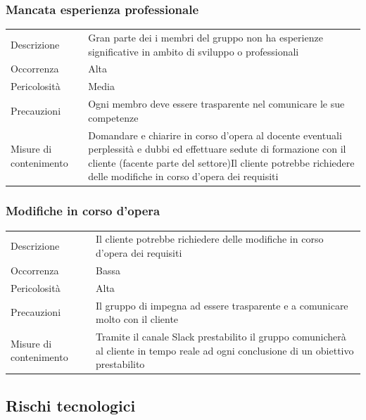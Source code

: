 \documentclass{article}
\begin{document}
\subsubsection{Mancata esperienza professionale}
\begin{center}
\begin{tabular}{P{10em} P{20em}} 
     Descrizione & Gran parte dei i membri del gruppo non ha esperienze significative in ambito di sviluppo o professionali\\ 
    Occorrenza & Alta\\
    Pericolosità & Media \\
    Precauzioni & Ogni membro deve essere trasparente nel comunicare le sue competenze \\
    Misure di contenimento & Domandare e chiarire in corso d'opera al docente eventuali perplessità e dubbi ed effettuare sedute di formazione con il cliente (facente parte del settore)Il cliente potrebbe richiedere delle modifiche in corso d'opera dei requisiti 
 \\
\end{tabular}
\end{center}

\subsubsection{Modifiche in corso d'opera}
\begin{center}
\begin{tabular}{P{10em} P{20em}} 
     Descrizione & Il cliente potrebbe richiedere delle modifiche in corso d'opera dei requisiti\\ 
    Occorrenza & Bassa\\
    Pericolosità & Alta \\
    Precauzioni & Il gruppo di impegna ad essere trasparente e a comunicare molto con il cliente \\
    Misure di contenimento & Tramite il canale Slack prestabilito il gruppo comunicherà al cliente in tempo reale ad ogni conclusione di un obiettivo prestabilito \\
\end{tabular}
\end{center}

\subsection{Rischi tecnologici}
\end{document}
